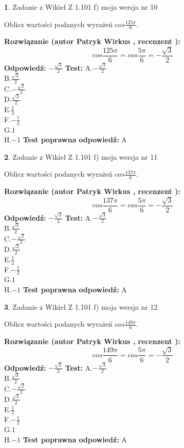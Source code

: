 \documentclass[12pt, a4paper]{article}
\theoremstyle{definition} %
\newtheorem{zad}{}
\newcommand{\zadStart}[1]{\begin{zad}#1\newline}
\newcommand{\zadStop}{\end{zad}}
\newcommand{\rozwStart}[2]{\noindent \textbf{Rozwiązanie (autor #1 , recenzent #2): }\newline}
\newcommand{\rozwStop}{\newline}
\newcommand{\odpStart}{\noindent \textbf{Odpowiedź:}\newline}
\newcommand{\odpStop}{\newline}
\newcommand{\testStart}{\noindent \textbf{Test:}\newline}
\newcommand{\testStop}{\newline}
\newcommand{\kluczStart}{\noindent \textbf{Test poprawna odpowiedź:}\newline}
\newcommand{\kluczStop}{\newline}
\begin{document}
\zadStart{Zadanie z Wikieł Z 1.101 f) moja wersja nr 10}

Oblicz wartości podanych wyrażeń $cos \frac{125\pi}{6}$.
\zadStop
\rozwStart{Patryk Wirkus}{}
$$cos \frac{125\pi}{6} = cos \frac{5\pi}{6} = -\frac{\sqrt{3}}{2}$$
\rozwStop
\odpStart
$-\frac{\sqrt{3}}{2}$
\odpStop
\testStart
A.$-\frac{\sqrt{3}}{2}$\\
B.$\frac{\sqrt{3}}{2}$\\
C.$-\frac{\sqrt{2}}{2}$\\
D.$\frac{\sqrt{3}}{2}$\\
E.$\frac{1}{2}$\\
F.$-\frac{1}{2}$\\
G.$1$\\
H.$-1$
\testStop
\kluczStart
A
\kluczStop



\zadStart{Zadanie z Wikieł Z 1.101 f) moja wersja nr 11}

Oblicz wartości podanych wyrażeń $cos \frac{137\pi}{6}$.
\zadStop
\rozwStart{Patryk Wirkus}{}
$$cos \frac{137\pi}{6} = cos \frac{5\pi}{6} = -\frac{\sqrt{3}}{2}$$
\rozwStop
\odpStart
$-\frac{\sqrt{3}}{2}$
\odpStop
\testStart
A.$-\frac{\sqrt{3}}{2}$\\
B.$\frac{\sqrt{3}}{2}$\\
C.$-\frac{\sqrt{2}}{2}$\\
D.$\frac{\sqrt{3}}{2}$\\
E.$\frac{1}{2}$\\
F.$-\frac{1}{2}$\\
G.$1$\\
H.$-1$
\testStop
\kluczStart
A
\kluczStop



\zadStart{Zadanie z Wikieł Z 1.101 f) moja wersja nr 12}

Oblicz wartości podanych wyrażeń $cos \frac{149\pi}{6}$.
\zadStop
\rozwStart{Patryk Wirkus}{}
$$cos \frac{149\pi}{6} = cos \frac{5\pi}{6} = -\frac{\sqrt{3}}{2}$$
\rozwStop
\odpStart
$-\frac{\sqrt{3}}{2}$
\odpStop
\testStart
A.$-\frac{\sqrt{3}}{2}$\\
B.$\frac{\sqrt{3}}{2}$\\
C.$-\frac{\sqrt{2}}{2}$\\
D.$\frac{\sqrt{3}}{2}$\\
E.$\frac{1}{2}$\\
F.$-\frac{1}{2}$\\
G.$1$\\
H.$-1$
\testStop
\kluczStart
A
\kluczStop
\end{document}
